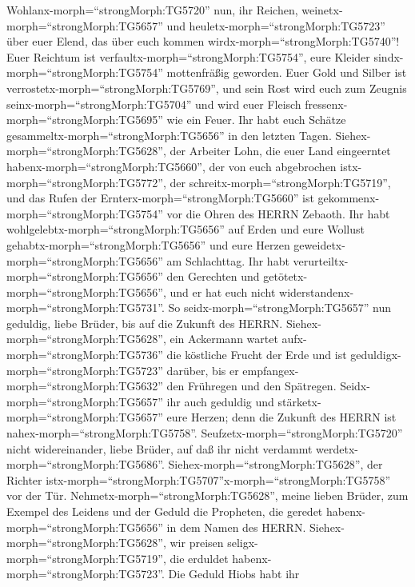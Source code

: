  Wohlanx-morph=``strongMorph:TG5720'' nun, ihr Reichen,
weinetx-morph=``strongMorph:TG5657'' und
heuletx-morph=``strongMorph:TG5723'' über euer Elend, das über euch
kommen wirdx-morph=``strongMorph:TG5740''!  Euer Reichtum
ist verfaultx-morph=``strongMorph:TG5754'', eure Kleider
sindx-morph=``strongMorph:TG5754'' mottenfräßig geworden. 
Euer Gold und Silber ist verrostetx-morph=``strongMorph:TG5769'', und
sein Rost wird euch zum Zeugnis seinx-morph=``strongMorph:TG5704'' und
wird euer Fleisch fressenx-morph=``strongMorph:TG5695'' wie ein Feuer.
Ihr habt euch Schätze gesammeltx-morph=``strongMorph:TG5656'' in den
letzten Tagen.  Siehex-morph=``strongMorph:TG5628'', der
Arbeiter Lohn, die euer Land eingeerntet
habenx-morph=``strongMorph:TG5660'', der von euch abgebrochen
istx-morph=``strongMorph:TG5772'', der
schreitx-morph=``strongMorph:TG5719'', und das Rufen der
Ernterx-morph=``strongMorph:TG5660'' ist
gekommenx-morph=``strongMorph:TG5754'' vor die Ohren des HERRN Zebaoth.
 Ihr habt wohlgelebtx-morph=``strongMorph:TG5656'' auf Erden
und eure Wollust gehabtx-morph=``strongMorph:TG5656'' und eure Herzen
geweidetx-morph=``strongMorph:TG5656'' am Schlachttag.  Ihr
habt verurteiltx-morph=``strongMorph:TG5656'' den Gerechten und
getötetx-morph=``strongMorph:TG5656'', und er hat euch nicht
widerstandenx-morph=``strongMorph:TG5731''.  So
seidx-morph=``strongMorph:TG5657'' nun geduldig, liebe Brüder, bis auf
die Zukunft des HERRN. Siehex-morph=``strongMorph:TG5628'', ein
Ackermann wartet aufx-morph=``strongMorph:TG5736'' die köstliche Frucht
der Erde und ist geduldigx-morph=``strongMorph:TG5723'' darüber, bis er
empfangex-morph=``strongMorph:TG5632'' den Frühregen und den Spätregen.
 Seidx-morph=``strongMorph:TG5657'' ihr auch geduldig und
stärketx-morph=``strongMorph:TG5657'' eure Herzen; denn die Zukunft des
HERRN ist nahex-morph=``strongMorph:TG5758''. 
Seufzetx-morph=``strongMorph:TG5720'' nicht widereinander, liebe Brüder,
auf daß ihr nicht verdammt werdetx-morph=``strongMorph:TG5686''.
Siehex-morph=``strongMorph:TG5628'', der Richter
istx-morph=``strongMorph:TG5707''\textbar x-morph=``strongMorph:TG5758''
vor der Tür.  Nehmetx-morph=``strongMorph:TG5628'', meine
lieben Brüder, zum Exempel des Leidens und der Geduld die Propheten, die
geredet habenx-morph=``strongMorph:TG5656'' in dem Namen des HERRN.
 Siehex-morph=``strongMorph:TG5628'', wir preisen
seligx-morph=``strongMorph:TG5719'', die erduldet
habenx-morph=``strongMorph:TG5723''. Die Geduld Hiobs habt ihr
